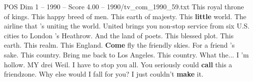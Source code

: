 \begin{textsample}{POS Dim 1 – 1990 – Score 4.00 – 1990/tv\_com\_1990\_59.txt}  \label{ex:f1_pos_060}
This royal throne of kings.
This happy breed of men.
This earth of majesty.
This \textbf{little} world.
The airline that 's uniting the world.
United brings you non-stop service from six U.S. cities to London 's Heathrow.
And the land of poets.
This blessed plot.
This earth.
This realm.
This England. \textbf{Come} fly the friendly skies.
For a friend 's sake.
This country.
Bring me back to Los Angeles.
This country.
What the...
I 'm hollow.
MY drei Weil.
I have to stop you all.
You seriously could \textbf{call} this a friendzone.
Why else would I fall for you?
I just couldn't \textbf{make} it.

\end{textsample}
